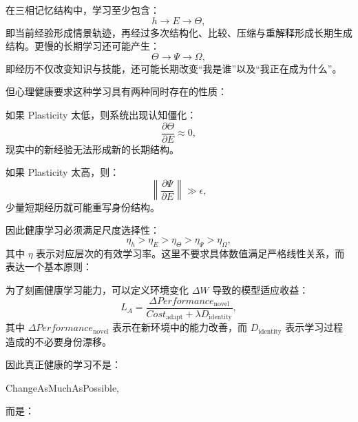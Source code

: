 在三相记忆结构中，学习至少包含：
\begin{equation}
h
\rightarrow
E
\rightarrow
\Theta,
\end{equation}
即当前经验形成情景轨迹，再经过多次结构化、比较、压缩与重解释形成长期生成结构。更慢的长期学习还可能产生：
\begin{equation}
\Theta
\rightarrow
\Psi
\rightarrow
\Omega,
\end{equation}
即经历不仅改变知识与技能，还可能长期改变“我是谁”以及“我正在成为什么”。

但心理健康要求这种学习具有两种同时存在的性质：
\begin{statementbox}
\centering
{}
\end{statementbox}

如果 Plasticity 太低，则系统出现认知僵化：
\begin{equation}
\frac{\partial \Theta}{\partial E}
\approx 0,
\end{equation}
现实中的新经验无法形成新的长期结构。

如果 Plasticity 太高，则：
\begin{equation}
\left\|
\frac{\partial \Psi}{\partial E}
\right\|
\gg
\epsilon,
\end{equation}
少量短期经历就可能重写身份结构。

因此健康学习必须满足尺度选择性：
\begin{equation}
\eta_h
>
\eta_E
>
\eta_\Theta
>
\eta_\Psi
>
\eta_\Omega,
\end{equation}
其中 $\eta$ 表示对应层次的有效学习率。这里不要求具体数值满足严格线性关系，而表达一个基本原则：
\begin{statementbox}
\centering
{}
\end{statementbox}

为了刻画健康学习能力，可以定义环境变化 $\Delta W$ 导致的模型适应收益：
\begin{equation}
L_A
=
\frac{
\Delta Performance_{\mathrm{novel}}
}{
Cost_{\mathrm{adapt}}
+
\lambda D_{\mathrm{identity}}
},
\end{equation}
其中 $\Delta Performance_{\mathrm{novel}}$ 表示在新环境中的能力改善，而 $D_{\mathrm{identity}}$ 表示学习过程造成的不必要身份漂移。

因此真正健康的学习不是：
\begin{statementbox}
ChangeAsMuchAsPossible,
\end{statementbox}
而是：
\begin{statementbox}
\centering
{}
\end{statementbox}

